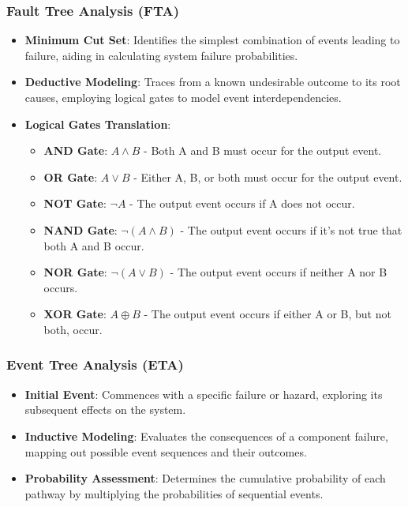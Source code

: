 \subsubsection*{Fault Tree Analysis (FTA)}
\begin{itemize}
    \item \textbf{Minimum Cut Set}: Identifies the simplest combination of events leading to failure, aiding in calculating system failure probabilities.
    \item \textbf{Deductive Modeling}: Traces from a known undesirable outcome to its root causes, employing logical gates to model event interdependencies.
    \item \textbf{Logical Gates Translation}:
        \begin{itemize}
            \item \textbf{AND Gate}: \(A \land B\) - Both A and B must occur for the output event.
            \item \textbf{OR Gate}: \(A \lor B\) - Either A, B, or both must occur for the output event.
            \item \textbf{NOT Gate}: \(\lnot A\) - The output event occurs if A does not occur.
            \item \textbf{NAND Gate}: \(\lnot(A \land B)\) - The output event occurs if it's not true that both A and B occur.
            \item \textbf{NOR Gate}: \(\lnot(A \lor B)\) - The output event occurs if neither A nor B occurs.
            \item \textbf{XOR Gate}: \(A \oplus B\) - The output event occurs if either A or B, but not both, occur.
        \end{itemize}
\end{itemize}

\subsubsection*{Event Tree Analysis (ETA)}
\begin{itemize}
    \item \textbf{Initial Event}: Commences with a specific failure or hazard, exploring its subsequent effects on the system.
    \item \textbf{Inductive Modeling}: Evaluates the consequences of a component failure, mapping out possible event sequences and their outcomes.
    \item \textbf{Probability Assessment}: Determines the cumulative probability of each pathway by multiplying the probabilities of sequential events.
\end{itemize}


